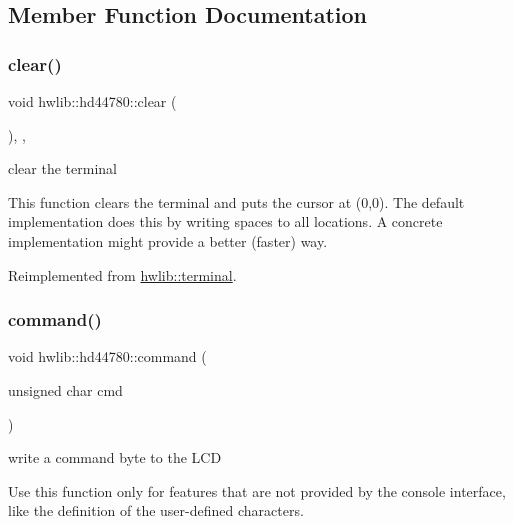 \subsection{Member Function Documentation}
\mbox{\label{classhwlib_1_1hd44780_a45d4a84c9da66fa350270df482c6e58f}} 
\subsubsection{\texorpdfstring{clear()}{clear()}}
{\footnotesize\ttfamily void hwlib\+::hd44780\+::clear (\begin{DoxyParamCaption}{ }\end{DoxyParamCaption})\hspace{0.3cm}{\ttfamily [inline]}, {\ttfamily [override]}, {\ttfamily [virtual]}}

clear the terminal

This function clears the terminal and puts the cursor at (0,0). The default implementation does this by writing spaces to all locations. A concrete implementation might provide a better (faster) way. 

Reimplemented from \hyperlink{classhwlib_1_1terminal_a89b385b6e92fd9d37e7ac16126ba8f32}{hwlib\+::terminal}.

\mbox{\label{classhwlib_1_1hd44780_aa2f8b43bd269d52dd281ec9e90a54f19}} 
\subsubsection{\texorpdfstring{command()}{command()}}
{\footnotesize\ttfamily void hwlib\+::hd44780\+::command (\begin{DoxyParamCaption}\item[{unsigned char}]{cmd }\end{DoxyParamCaption})\hspace{0.3cm}{\ttfamily [inline]}}

write a command byte to the L\+CD

Use this function only for features that are not provided by the console interface, like the definition of the user-\/defined characters. \mbox{\label{classhwlib_1_1hd44780_a9a80f74a98efab5fe3a78e8649fd95bb}} 
